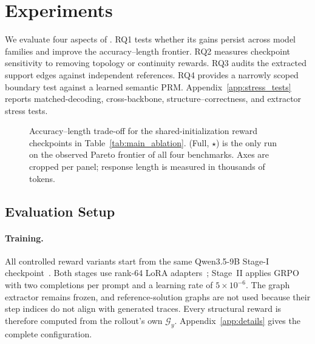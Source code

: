 \section{Experiments}
\label{sec:experiments}

We evaluate four aspects of \method. RQ1 tests whether its gains persist across model families and improve the accuracy--length frontier. RQ2 measures checkpoint sensitivity to removing topology or continuity rewards. RQ3 audits the extracted support edges against independent references. RQ4 provides a narrowly scoped boundary test against a learned semantic PRM. Appendix~\ref{app:stress_tests} reports matched-decoding, cross-backbone, structure--correctness, and extractor stress tests. 



\begin{figure}[!t]
\centering

\caption{Accuracy--length trade-off for the shared-initialization reward checkpoints in Table~\ref{tab:main_ablation}. \method (Full, $\star$) is the only run on the observed Pareto frontier of all four benchmarks. Axes are cropped per panel; response length is measured in thousands of tokens.}
\label{fig:pareto_frontier}
\end{figure}

\subsection{Evaluation Setup}
\label{sec:setup}

\paragraph{Training.}
All controlled reward variants start from the same Qwen3.5-9B Stage-I checkpoint~\citep{qwen35team2026}. Both stages use rank-64 LoRA adapters~\citep{hu2022lora}; Stage~II applies GRPO with two completions per prompt and a learning rate of $5\times10^{-6}$. The graph extractor remains frozen, and reference-solution graphs are not used because their step indices do not align with generated traces. Every structural reward is therefore computed from the rollout's own $\mathcal{G}_y$. Appendix~\ref{app:details} gives the complete configuration.

